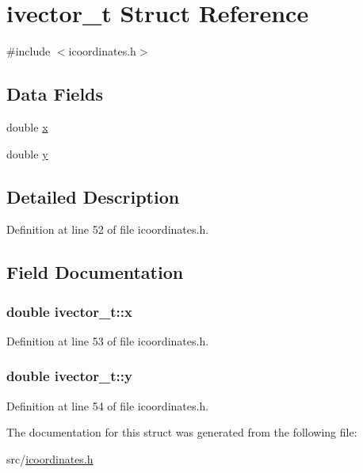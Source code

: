 \hypertarget{structivector__t}{\section{ivector\-\_\-t Struct Reference}
\label{structivector__t}
}


{\ttfamily \#include $<$icoordinates.\-h$>$}

\subsection*{Data Fields}
\begin{DoxyCompactItemize}
\item 
double \hyperlink{structivector__t_a4b91a8fcb6a98d2ba8e2f5d483d7c577}{x}
\item 
double \hyperlink{structivector__t_af6af8ee13897aea97b1d8fe42bb83b17}{y}
\end{DoxyCompactItemize}


\subsection{Detailed Description}


Definition at line 52 of file icoordinates.\-h.



\subsection{Field Documentation}
\hypertarget{structivector__t_a4b91a8fcb6a98d2ba8e2f5d483d7c577}{
\subsubsection[{x}]{\setlength{\rightskip}{0pt plus 5cm}double ivector\-\_\-t\-::x}}\label{structivector__t_a4b91a8fcb6a98d2ba8e2f5d483d7c577}


Definition at line 53 of file icoordinates.\-h.

\hypertarget{structivector__t_af6af8ee13897aea97b1d8fe42bb83b17}{
\subsubsection[{y}]{\setlength{\rightskip}{0pt plus 5cm}double ivector\-\_\-t\-::y}}\label{structivector__t_af6af8ee13897aea97b1d8fe42bb83b17}


Definition at line 54 of file icoordinates.\-h.



The documentation for this struct was generated from the following file\-:\begin{DoxyCompactItemize}
\item 
src/\hyperlink{icoordinates_8h}{icoordinates.\-h}\end{DoxyCompactItemize}

